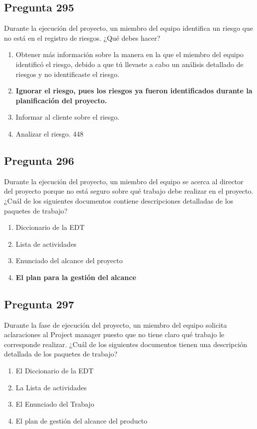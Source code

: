 \documentclass[11pt,a4paper]{article}
\begin{document}
\subsection*{Pregunta 295}
Durante la ejecución del proyecto, un miembro del equipo identifica un riesgo que no está en el registro de riesgos. ¿Qué debes hacer?

\begin{enumerate}[label=\alph*)]
  \item Obtener más información sobre la manera en la que el miembro del equipo identificó el riesgo, debido a que tú llevaste a cabo un análisis detallado de riesgos y no identificaste el riesgo.
  \item \textbf{Ignorar el riesgo, pues los riesgos ya fueron identificados durante la planificación del proyecto.}
  \item Informar al cliente sobre el riesgo.
  \item Analizar el riesgo. 448
\end{enumerate}

\subsection*{Pregunta 296}
Durante la ejecución del proyecto, un miembro del equipo se acerca al director del proyecto porque no está seguro sobre qué trabajo debe realizar en el proyecto. ¿Cuál de los siguientes documentos contiene descripciones detalladas de los paquetes de trabajo?

\begin{enumerate}[label=\alph*)]
  \item Diccionario de la EDT
  \item Lista de actividades
  \item Enunciado del alcance del proyecto
  \item \textbf{El plan para la gestión del alcance}
\end{enumerate}

\subsection*{Pregunta 297}
Durante la fase de ejecución del proyecto, un miembro del equipo solicita aclaraciones al Project manager puesto que no tiene claro qué trabajo le corresponde realizar. ¿Cuál de los siguientes documentos tienen una descripción detallada de los paquetes de trabajo?

\begin{enumerate}[label=\alph*)]
  \item El Diccionario de la EDT
  \item La Lista de actividades
  \item El Enunciado del Trabajo
  \item El plan de gestión del alcance del producto
\end{enumerate}
\end{document}
